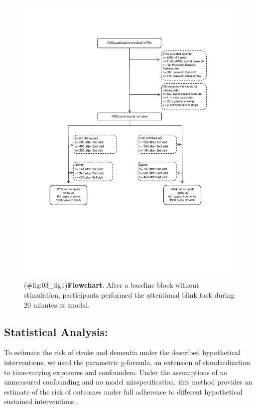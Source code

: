 \documentclass[
]{book}
\begin{document}
\begin{figure}
\centering
\includegraphics{figs/03_fig1.pdf}
\caption{(\#fig:03\_fig1)\textbf{Flowchart}. After a baseline block without stimulation, participants performed the attentional blink task during 20 minutes of anodal.}
\end{figure}



\hypertarget{statistical-analysis}{%
\subsection{Statistical Analysis:}\label{statistical-analysis}}

To estimate the risk of stroke and dementia under the described hypothetical interventions, we used the parametric g-formula, an extension of standardization to time-varying exposures and confounders. Under the assumptions of no unmeasured confounding and no model misspecification, this method provides an estimate of the risk of outcomes under full adherence to different hypothetical sustained interventions \autocite{taubman2009,garcia_aymerich2014,danaei_epid2013,vangenlonne2018,dickerman2019}.
\end{document}
